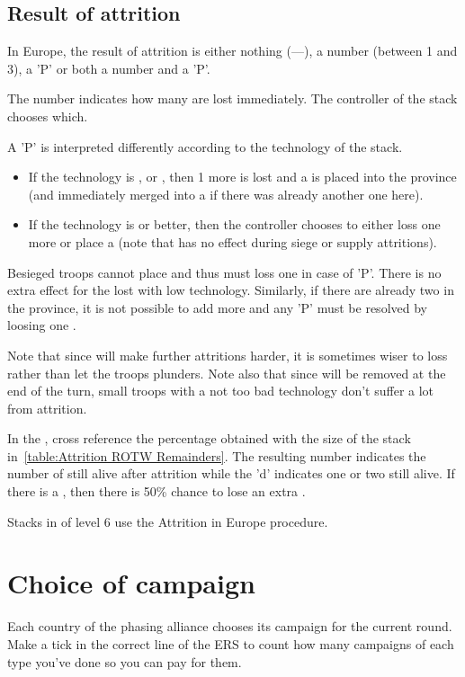 \subsection{Result of attrition}
In Europe, the result of attrition is either nothing (---), a number
(between 1 and 3), a 'P' or both a number and a 'P'.

The number indicates how many \LD are lost immediately. The controller of the
stack chooses which.

A 'P' is interpreted differently according to the technology of the stack.
\begin{itemize}
\item If the technology is \TMED, \TREN or \TARQ, then 1 more \LD is lost and
  a \PILLAGE\facemoins is placed into the province (and immediately merged
  into a \PILLAGE\faceplus if there was already another one here).
\item If the technology is \TMUS or better, then the controller chooses to
  either loss one more \LD or place a \PILLAGE\facemoins (note that
   has no effect during siege or supply attritions).
\end{itemize}

Besieged troops cannot place \PILLAGE and thus must loss one \LD in case of
'P'. There is no extra effect for the lost \PILLAGE with low
technology. Similarly, if there are already two \PILLAGE\faceplus in the
province, it is not possible to add more and any 'P' must be resolved by
loosing one \LD.

Note that since \PILLAGE will make further attritions harder, it is sometimes
wiser to loss \LD rather than let the troops plunders. Note also that since
\PILLAGE\facemoins will be removed at the end of the turn, small troops with a
not too bad technology don't suffer a lot from attrition.

\smallskip

In the \ROTW, cross reference the percentage obtained with the size of the
stack in~\ref{table:Attrition ROTW Remainders}. The resulting number indicates
the number of \LD still alive after attrition while the 'd' indicates one or
two \LDE still alive. If there is a \textetoile, then there is 50\% chance to
lose an extra \LDE.

Stacks in \COL of level 6 use the Attrition in Europe procedure.


\section{Choice of campaign}
\label{chMilitary:Choice of campaign}
Each country of the phasing alliance chooses its campaign for the current
round. Make a tick in the correct line of the ERS to count how many campaigns
of each type you've done so you can pay for them.

